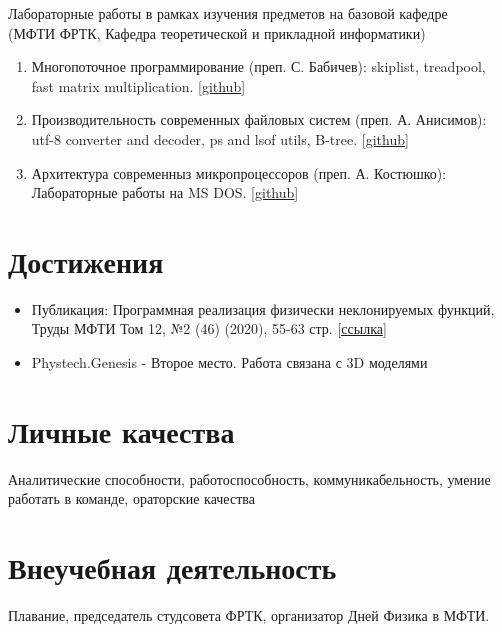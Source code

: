 \documentclass[letterpaper]{twentysecondcv} %
\begin{document}
Лабораторные работы в рамках изучения предметов на базовой кафедре \\
(МФТИ ФРТК, Кафедра теоретической и прикладной информатики)
\begin{enumerate}
    \item Многопоточное программирование (преп. С. Бабичев): skiplist, treadpool, fast matrix multiplication. [\underline{\href{https://github.com/inedostoev/ParProg}{github}}]
    
    \item Производительность современных файловых систем (преп. А. Анисимов): utf-8 converter and decoder, ps and lsof utils, B-tree. [\underline{\href{https://github.com/inedostoev/filesystem}{github}}]
    
    \item Архитектура современныз микропроцессоров (преп. А. Костюшко): Лабораторные работы на MS DOS. [\underline{\href{https://github.com/inedostoev/dos-labs}{github}}]
\end{enumerate}
        


\section{Достижения}

\begin{itemize}
    \item Публикация: Программная реализация физически неклонируемых функций, Труды МФТИ Том 12, №2 (46) (2020), 55-63 стр.  [\underline{\href{https://mipt.ru/upload/medialibrary/1ee/5_martvel_55_63.pdf}{ссылка}}]
    \item {} Phystech.Genesis - Второе место. Работа связана с 3D моделями
\end{itemize}

\section{Личные качества} 

\newline Аналитические способности, работоспособность, коммуникабельность, умение работать в команде, ораторские качества

\section{Внеучебная деятельность} 

\newline Плавание, председатель студсовета ФРТК, организатор Дней Физика в
МФТИ.
\end{document}
